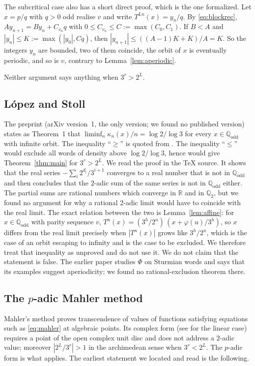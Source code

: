 \documentclass[11pt,reqno]{amsart}
\theoremstyle{definition}
\theoremstyle{remark}
\newcommand{\Q}{\mathbb{Q}}
\newcommand{\Qodd}{\mathbb{Q}_{\mathrm{odd}}}
\begin{document}
The subcritical case also has a short direct proof, which is the one
formalized.  Let $x=p/q$ with $q>0$ odd realise $v$ and write
$T^{Ln}(x)=y_n/q$.  By \eqref{eq:blockrec}, $Ay_{n+1}=By_n+C_{v_n}q$ with
$0\le C_{v_n}\le C:=\max(C_0,C_1)$.  If $B<A$ and
$|y_n|\le K:=\max(|y_0|,Cq)$, then
$|y_{n+1}|\le((A-1)K+K)/A=K$.  So the integers $y_n$ are bounded, two of
them coincide, the orbit of $x$ is eventually periodic, and so is $v$,
contrary to Lemma~\ref{lem:aperiodic}.

Neither argument says anything when $3^{r}>2^{L}$.

\subsection{L\'opez and Stoll}
The preprint \cite{LopezStoll2021} (arXiv version~1, the only version;
we found no published version) states as Theorem~1 that
$\liminf_n\kappa_n(x)/n=\log 2/\log 3$ for every $x\in\Qodd$ with infinite
orbit.  The inequality ``$\ge$'' is quoted from \cite{MonksYazinski2004}.
The inequality ``$\le$'' would exclude all words of density above
$\log 2/\log 3$, hence would give Theorem~\ref{thm:main} for
$3^{r}>2^{L}$.  We read the proof in the TeX source.  It shows that the
real series $-\sum_i2^{d_i}/3^{i+1}$ converges to a real number that is not
in $\Qodd$ and then concludes that the $2$-adic sum of the same series is
not in $\Qodd$ either.  The partial sums are rational numbers which
converge in $\mathbb R$ and in $\Q_2$, but we found no argument for why a rational $2$-adic limit
would have to coincide with the real limit.  The exact relation between
the two is Lemma~\ref{lem:affine}: for $x\in\Qodd$ with parity sequence $v$,
$T^{n}(x)=(3^{h}/2^{n})\,(x+\varphi(u)/3^{h})$, so $x$ differs from the real
limit precisely when $|T^{n}(x)|$ grows like $3^{h}/2^{n}$, which is the
case of an orbit escaping to infinity and is the case to be excluded.  We
therefore treat that inequality as unproved and do not use it.  We do not
claim that the statement is false.  The earlier paper \cite{LopezStoll2009}
studies $\Phi$ on Sturmian words and says that its examples suggest
aperiodicity; we found no rational-exclusion theorem there.

\subsection{The $p$-adic Mahler method}\label{ssec:mahler}
Mahler's method \cite{Mahler1929,Nishioka1996} proves transcendence of
values of functions satisfying equations such as \eqref{eq:mahler} at
algebraic points.  Its complex form (see \cite{AdamczewskiFaverjon2017} for
the linear case) requires a point of the open
complex unit disc and does not address a $2$-adic value; moreover
$|2^{L}/3^{r}|>1$ in the archimedean sense when $3^r<2^L$.  The $p$-adic
form is what applies.  The earliest statement we located and read is the
following.
\end{document}
